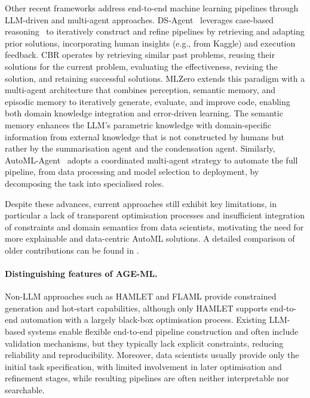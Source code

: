 \documentclass[runningheads]{llncs}
\newcommand{\ourapproach}[0]{\textsc{AGE-ML}}
\begin{document}
Other recent frameworks address end-to-end machine learning pipelines through \ac{LLM}-driven and multi-agent approaches.
%
DS-Agent~\cite{DBLP:conf/icml/GuoD0C0024} leverages case-based reasoning~\cite{kolodner1992introduction}
to iteratively construct and refine pipelines by retrieving and adapting prior solutions,
incorporating human insights
(e.g., from Kaggle)
and execution feedback.
%
CBR operates by retrieving similar past problems,
reusing their solutions for the current problem,
evaluating the effectiveness,
revising the solution,
and
retaining successful solutions.
%
MLZero \cite{DBLP:journals/corr/abs-2505-13941} extends this paradigm with a multi-agent architecture
that combines perception, semantic memory, and episodic memory
to iteratively generate, evaluate, and improve code,
enabling both domain knowledge integration and error-driven learning.
%
The semantic memory enhances the \ac{LLM}'s parametric knowledge with domain-specific information
from external knowledge that is not constructed by humans but rather by the summarisation agent
and the condensation agent.
%
Similarly,
AutoML-Agent~\cite{DBLP:conf/icml/TriratJH25} adopts a coordinated multi-agent strategy to automate the full pipeline,
from data processing and model selection to deployment,
by decomposing the task into specialised roles.

Despite these advances,
current approaches still exhibit key limitations,
in particular a lack of transparent optimisation processes and insufficient integration of constraints and domain semantics from data scientists,
motivating the need for more explainable and data-centric \ac{AutoML} solutions.
%
A detailed comparison of older contributions can be found in \cite{DBLP:conf/icml/TriratJH25}.

\paragraph{Distinguishing features of \ourapproach{}.}

% 

%
Non-\ac{LLM} approaches such as HAMLET and FLAML provide constrained generation and hot-start capabilities,
although only HAMLET supports end-to-end automation with a largely black-box optimisation process.
%
Existing \ac{LLM}-based systems enable flexible end-to-end pipeline construction and often include validation mechanisms,
but they typically lack explicit constraints, reducing reliability and reproducibility.
%
Moreover, data scientists usually provide only the initial task specification,
with limited involvement in later optimisation and refinement stages,
while resulting pipelines are often neither interpretable nor searchable.
\end{document}
